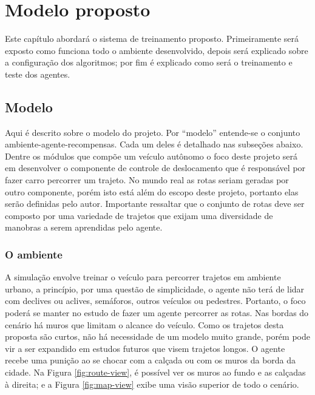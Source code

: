 \chapter{Modelo proposto}\label{cap:proposta}
Este capítulo abordará o sistema de treinamento proposto. Primeiramente será exposto como funciona todo o ambiente desenvolvido, depois será explicado sobre a configuração dos algoritmos; por fim é explicado como será o treinamento e teste dos agentes. 

\section{Modelo}\label{modelo}
Aqui é descrito sobre o modelo do projeto. Por ``modelo'' entende-se o conjunto ambiente-agente-recompensas. Cada um deles é detalhado nas subseções abaixo. Dentre os módulos que compõe um veículo autônomo o foco deste projeto será em desenvolver o componente de controle de deslocamento que é responsável por fazer carro percorrer um trajeto. No mundo real as rotas seriam geradas por outro componente, porém isto está além do escopo deste projeto, portanto elas serão definidas pelo autor. Importante ressaltar que o conjunto de rotas deve ser composto por uma variedade de trajetos que exijam uma diversidade de manobras a serem aprendidas pelo agente.

\subsection{O ambiente}
A simulação envolve treinar o veículo para percorrer trajetos em ambiente urbano, a princípio, por uma questão de simplicidade, o agente não terá de lidar com declives ou aclives, semáforos, outros veículos ou pedestres. Portanto, o foco poderá se manter no estudo de fazer um agente percorrer as rotas. Nas bordas do cenário há muros que limitam o alcance do veículo. Como os trajetos desta proposta são curtos, não há necessidade de um modelo muito grande, porém pode vir a ser expandido em estudos futuros que visem trajetos longos. O agente recebe uma punição ao se chocar com a calçada ou com os muros da borda da cidade. Na Figura \ref{fig:route-view}, é possível ver os muros ao fundo e as calçadas à direita; e a Figura \ref{fig:map-view} exibe uma visão superior de todo o cenário.

